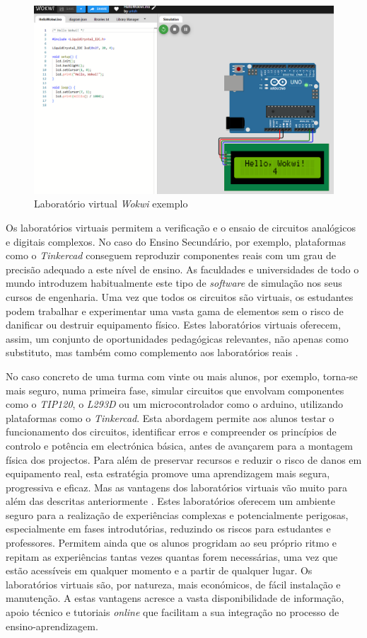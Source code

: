 \begin{figure}[hbtp]
    \centering
    \includegraphics[width=0.6\linewidth]{figures/wokwi.png}
    \caption{Laboratório virtual \textit{Wokwi} exemplo}
    \label{fig:wokwi}
\end{figure}

Os laboratórios virtuais permitem a verificação e o ensaio de circuitos analógicos e digitais complexos. No caso do Ensino Secundário, por exemplo, plataformas como o \textit{Tinkercad} conseguem reproduzir componentes reais com um grau de precisão adequado a este nível de ensino. As faculdades e universidades de todo o mundo introduzem habitualmente este tipo de \textit{software} de simulação nos seus cursos de engenharia. Uma vez que todos os circuitos são virtuais, os estudantes podem trabalhar e experimentar uma vasta gama de elementos sem o risco de danificar ou destruir equipamento físico. Estes laboratórios virtuais oferecem, assim, um conjunto de oportunidades pedagógicas relevantes, não apenas como substituto, mas também como complemento aos laboratórios reais \cite{WebBrowserSimulators}. 

No caso concreto de uma turma com vinte ou mais alunos, por exemplo, torna-se mais seguro, numa primeira fase, simular circuitos que envolvam componentes como o \textit{TIP120}, o \textit{L293D} ou um microcontrolador como o \gls{arduino}, utilizando plataformas como o \textit{Tinkercad}. Esta abordagem permite aos alunos testar o funcionamento dos circuitos, identificar erros e compreender os princípios de controlo e potência em electrónica básica, antes de avançarem para a montagem física dos projectos. Para além de preservar recursos e reduzir o risco de danos em equipamento real, esta estratégia promove uma aprendizagem mais segura, progressiva e eficaz. Mas as vantagens dos laboratórios virtuais vão muito para além das descritas anteriormente \cite{scheckler, lynch, BlogeMas95, vabtegensVL}. Estes laboratórios oferecem um ambiente seguro para a realização de experiências complexas e potencialmente perigosas, especialmente em fases introdutórias, reduzindo os riscos para estudantes e professores. Permitem ainda que os alunos progridam ao seu próprio ritmo e repitam as experiências tantas vezes quantas forem necessárias, uma vez que estão acessíveis em qualquer momento e a partir de qualquer lugar. Os laboratórios virtuais são, por natureza, mais económicos, de fácil instalação e manutenção. A estas vantagens acresce a vasta disponibilidade de informação, apoio técnico e tutoriais \textit{online} que facilitam a sua integração no processo de ensino-aprendizagem.

